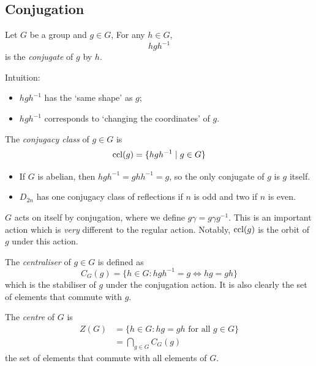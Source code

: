 \documentclass{../../template/note}
\begin{document}
    \subsection{Conjugation}

    \begin{definition}
        Let \(G\) be a group and \(g \in G\), For any \(h \in G\),
        \[
            hgh^{-1}
        \]
        is the \emph{conjugate} of \(g\) by \(h\).
    \end{definition}
    Intuition:

    \begin{itemize}
        \item \(hgh^{-1}\) has the `same shape' as \(g\);
        \item \(hgh^{-1}\) corresponds to `changing the coordinates' of \(g\).
    \end{itemize}

    \begin{definition}
        The \emph{conjugacy class} of \(g \in G\) is
        \[
            \operatorname{ccl}(g) = \{hgh^{-1} \mid g \in G\}
        \]
    \end{definition}
    
    \begin{example*}
        \begin{itemize}
            \item If \(G\) is abelian, then \(hgh^{-1} = ghh^{-1} = g\), so the only conjugate of \(g\) is \(g\) itself.
            \item \(D_{2n}\) has one conjugacy class of reflections if \(n\) is odd and two if \(n\) is even.
        \end{itemize}
    \end{example*}
    
    \(G\) acts on itself by conjugation, where we define \(g\gamma = g\gamma g^{-1}\). This is an important action which is \emph{very} different to the regular action. Notably, \(\operatorname{ccl}(g)\) is the orbit of \(g\) under this action.

    \begin{definition}
        The \emph{centraliser} of \(g \in G\) is defined as
        \[
            C_G(g) = \{h \in G: hgh^{-1} = g \iff hg = gh\}
        \]
        which is the stabiliser of \(g\) under the conjugation action. It is also clearly the set of elements that commute with \(g\).
    \end{definition}
    
    \begin{definition}
        The \emph{centre} of \(G\) is
        \begin{align*}
            Z(G) &= \{h \in G: hg = gh \text{ for all } g \in G\} \\
            &= \bigcap_{g \in G} C_G(g)
        \end{align*}
        the set of elements that commute with all elements of \(G\).
    \end{definition}
    
\end{document}
